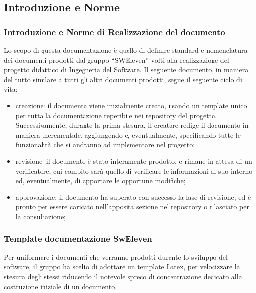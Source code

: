 \subsection{Introduzione e Norme}
\subsubsection{Introduzione e Norme di Realizzazione del documento}
Lo scopo di questa documentazione è quello di definire standard e nomenclatura dei documenti prodotti dal gruppo “SWEleven” volti alla realizzazione del progetto didattico di Ingegneria del Software.
Il seguente documento, in maniera del tutto similare a tutti gli altri documenti prodotti, segue il seguente ciclo di vita:
\begin{itemize}
\item creazione: il documento viene inizialmente creato, usando un template unico per tutta la documentazione reperibile nei repository del progetto. Successivamente, durante la prima stesura, il creatore redige il documento in maniera incrementale, aggiungendo e, eventualmente, specificando tutte le funzionalità che si andranno ad implementare nel progetto;
\item revisione: il documento è stato interamente prodotto, e rimane in attesa di un verificatore, cui compito sarà quello di verificare le informazioni al suo interno ed, eventualmente, di apportare le opportune modifiche;
\item approvazione: il documento ha superato con successo la fase di revisione, ed è pronto per essere caricato nell’apposita sezione nel repository o rilasciato per la consultazione;
\end{itemize}
\subsubsection{Template documentazione SwEleven}
Per uniformare i documenti che verranno prodotti durante lo sviluppo del software, il gruppo ha scelto di adottare un template Latex, per velocizzare la stesura degli stessi riducendo il notevole spreco di concentrazione dedicato alla costruzione iniziale di un documento.